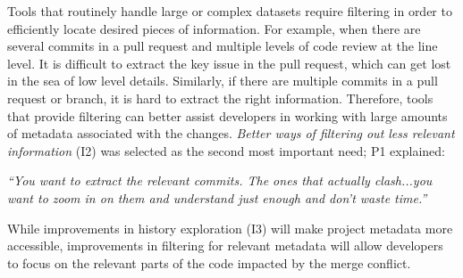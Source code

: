 \label{better_filtering}
Tools that routinely handle large or complex datasets require filtering in order to efficiently locate desired pieces of information.
For example, when there are several commits in a pull request and multiple levels of code review at the line level.
It is difficult to extract the key issue in the pull request, which can get lost in the sea of low level details. Similarly, if there are multiple commits in a pull request or branch, it is hard to extract the right information.
Therefore, tools that provide filtering can better assist developers in working with large amounts of metadata associated with the changes.
\textit{Better ways of filtering out less relevant information} (I2) was selected as the second most important need; P1 explained:
\begin{quoting}
\textit{``You want to extract the relevant commits. The ones that actually clash...you want to zoom in on them and understand just enough and don't waste time.''}
\end{quoting}

While improvements in history exploration (I3) will make project metadata more accessible, improvements in filtering for relevant metadata will allow developers to focus on the relevant parts of the code impacted by the merge conflict.

